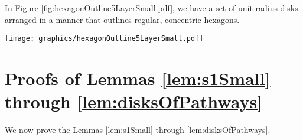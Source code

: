 \documentclass[10pt]{CSUNthesis}
\theoremstyle{plain}%
\theoremstyle{definition}
\theoremstyle{remark}
\begin{document}
In Figure \ref{fig:hexagonOutline5LayerSmall.pdf}, we have a set of unit radius disks arranged in a manner that outlines regular, concentric hexagons.

\begin{minipage}{\linewidth}
\begin{center}
\texttt{[image: graphics/hexagonOutline5LayerSmall.pdf]}
\label{fig:hexagonOutline5LayerSmall.pdf}
\end{center}
\end{minipage}
\section{Proofs of Lemmas \ref{lem:s1Small} through \ref{lem:disksOfPathways}}
We now prove the Lemmas \ref{lem:s1Small} through \ref{lem:disksOfPathways}.
\end{document}
